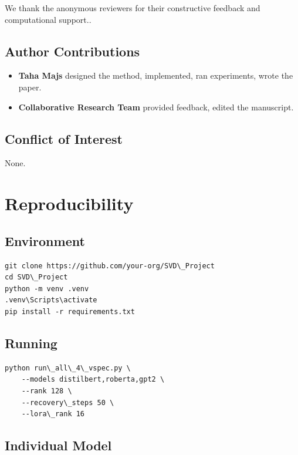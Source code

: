 We thank the anonymous reviewers for their constructive feedback and computational support..

\subsection{Author Contributions}

\begin{itemize}
\item \textbf{Taha Majs} designed the method, implemented, ran experiments, wrote
  the paper.
\item \textbf{Collaborative Research Team} provided feedback, edited the manuscript.

\end{itemize}
\subsection{Conflict of Interest}

None.



\section{Reproducibility}

\subsection{Environment}

\begin{lstlisting}
git clone https://github.com/your-org/SVD\_Project
cd SVD\_Project
python -m venv .venv
.venv\Scripts\activate
pip install -r requirements.txt
\end{lstlisting}

\subsection{Running}

\begin{lstlisting}
python run\_all\_4\_vspec.py \
    --models distilbert,roberta,gpt2 \
    --rank 128 \
    --recovery\_steps 50 \
    --lora\_rank 16
\end{lstlisting}

\subsection{Individual Model}

